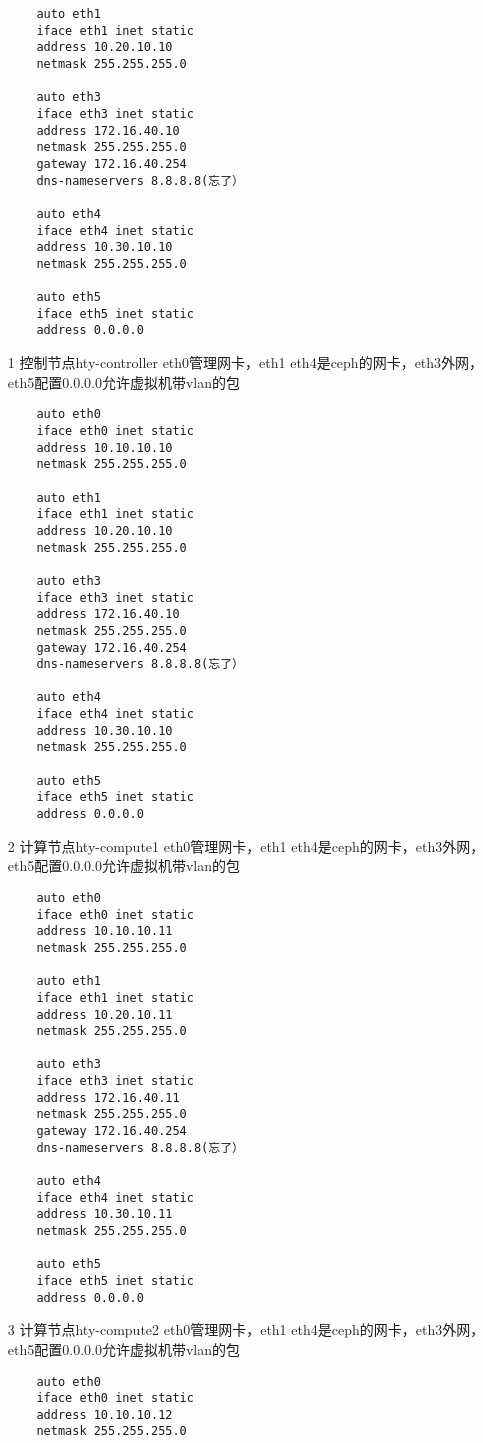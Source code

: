 \documentclass[a4paper,left=1.5cm,right=1.5cm,11pt]{article}
\begin{document}
\begin{itemize}
\begin{lstlisting}
	auto eth1
	iface eth1 inet static
	address 10.20.10.10
	netmask 255.255.255.0

	auto eth3
	iface eth3 inet static
	address 172.16.40.10
	netmask 255.255.255.0
	gateway 172.16.40.254
	dns-nameservers 8.8.8.8(忘了）
	
	auto eth4
	iface eth4 inet static
	address 10.30.10.10
	netmask 255.255.255.0

	auto eth5
	iface eth5 inet static
	address 0.0.0.0
	\end{lstlisting}

	\item[1]控制节点hty-controller
	eth0管理网卡，eth1 eth4是ceph的网卡，eth3外网，eth5配置0.0.0.0允许虚拟机带vlan的包
	\begin{lstlisting}
	auto eth0
	iface eth0 inet static
	address 10.10.10.10
	netmask 255.255.255.0

	auto eth1
	iface eth1 inet static
	address 10.20.10.10
	netmask 255.255.255.0

	auto eth3
	iface eth3 inet static
	address 172.16.40.10
	netmask 255.255.255.0
	gateway 172.16.40.254
	dns-nameservers 8.8.8.8(忘了）
	
	auto eth4
	iface eth4 inet static
	address 10.30.10.10
	netmask 255.255.255.0

	auto eth5
	iface eth5 inet static
	address 0.0.0.0
	\end{lstlisting}

	\item[2]计算节点hty-compute1
	eth0管理网卡，eth1 eth4是ceph的网卡，eth3外网，eth5配置0.0.0.0允许虚拟机带vlan的包
	\begin{lstlisting}
	auto eth0
	iface eth0 inet static
	address 10.10.10.11
	netmask 255.255.255.0

	auto eth1
	iface eth1 inet static
	address 10.20.10.11
	netmask 255.255.255.0

	auto eth3
	iface eth3 inet static
	address 172.16.40.11
	netmask 255.255.255.0
	gateway 172.16.40.254
	dns-nameservers 8.8.8.8(忘了）
	
	auto eth4
	iface eth4 inet static
	address 10.30.10.11
	netmask 255.255.255.0

	auto eth5
	iface eth5 inet static
	address 0.0.0.0
	\end{lstlisting}

	\item[3]计算节点hty-compute2
	eth0管理网卡，eth1 eth4是ceph的网卡，eth3外网，eth5配置0.0.0.0允许虚拟机带vlan的包
	\begin{lstlisting}
	auto eth0
	iface eth0 inet static
	address 10.10.10.12
	netmask 255.255.255.0


\end{lstlisting}
\end{itemize}
\end{document}
